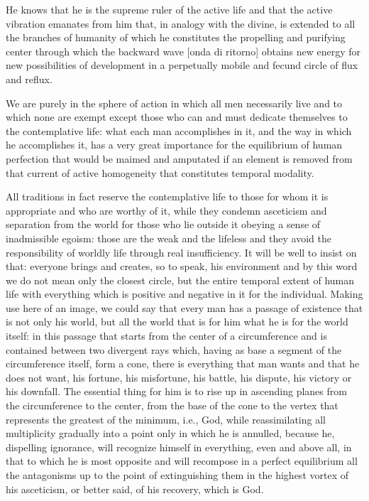 He knows that he is the supreme ruler of the active life and that the active vibration emanates from him that, in analogy with the divine, is extended to all the branches of humanity of which he constitutes the propelling and purifying center through which the backward wave [onda di ritorno] obtains new energy for new possibilities of development in a perpetually mobile and fecund circle of flux and reflux.

We are purely in the sphere of action in which all men necessarily live and to which none are exempt except those who can and must dedicate themselves to the contemplative life: what each man accomplishes in it, and the way in which he accomplishes it, has a very great importance for the equilibrium of human perfection that would be maimed and amputated if an element is removed from that current of active homogeneity that constitutes temporal modality.

All traditions in fact reserve the contemplative life to those for whom it is appropriate and who are worthy of it, while they condemn asceticism and separation from the world for those who lie outside it obeying a sense of inadmissible egoism: those are the weak and the lifeless and they avoid the responsibility of worldly life through real insufficiency. It will be well to insist on that: everyone brings and creates, so to speak, his environment and by this word we do not mean only the closest circle, but the entire temporal extent of human life with everything which is positive and negative in it for the individual. Making use here of an image, we could say that every man has a passage of existence that is not only his world, but all the world that is for him what he is for the world itself: in this passage that starts from the center of a circumference and is contained between two divergent rays which, having as base a segment of the circumference itself, form a cone, there is everything that man wants and that he does not want, his fortune, his misfortune, his battle, his dispute, his victory or his downfall. The essential thing for him is to rise up in ascending planes from the circumference to the center, from the base of the cone to the vertex that represents the greatest of the minimum, i.e., God, while reassimilating all multiplicity gradually into a point only in which he is annulled, because he, dispelling ignorance, will recognize himself in everything, even and above all, in that to which he is most opposite and will recompose in a perfect equilibrium all the antagonisms up to the point of extinguishing them in the highest vortex of his asceticism, or better said, of his recovery, which is God.

